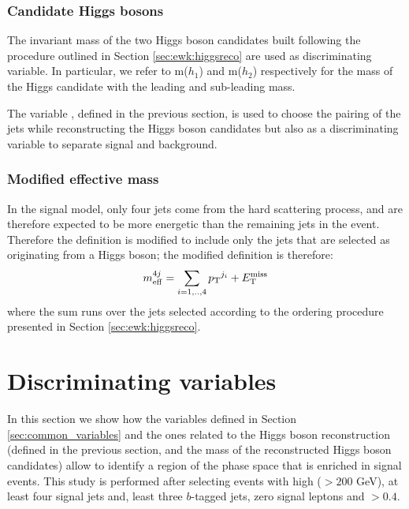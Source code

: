 \subsubsection*{Candidate Higgs bosons}

The invariant mass of the two Higgs boson candidates built following the procedure outlined in Section \ref{sec:ewk:higgsreco} 
are used as discriminating variable. In particular, we refer to m($h_1$) and m($h_2$) respectively for the mass of the Higgs candidate with 
the leading and sub-leading mass.

The variable \dRmax, defined in the previous section, is used to choose the pairing of the jets while reconstructing 
the Higgs boson candidates but also as a discriminating variable to separate signal and background. 

\subsubsection*{Modified effective mass}

In the signal model, only four jets come from the hard scattering process, and are therefore expected to be more energetic than the 
remaining jets in the event. Therefore the \meff definition is modified to include only the jets that are selected 
as originating from a Higgs boson; the modified definition is therefore:
\begin{equation}
m_{\mathrm{eff}}^{4j} = \sum_{i=1,..,4} {p_{\rm T}}^{j_i} + E_{\rm T}^{\mathrm{miss}}
\end{equation}
\noindent where the sum runs over the jets selected according to the ordering procedure presented in Section \ref{sec:ewk:higgsreco}. 


\section{Discriminating variables}
\label{sec:ewk:sigbkg}

In this section we show how the variables defined in Section \ref{sec:common_variables} and the ones related
to the Higgs boson reconstruction (\dRmax defined in the previous section, and the mass of the reconstructed Higgs boson candidates)
allow to identify a region of the phase space that is enriched in signal events. 
This study is performed after selecting events with high \met ($> 200$ GeV), at least four signal jets and, least three $b$-tagged jets, zero signal leptons and \dphimin $>0.4$.

